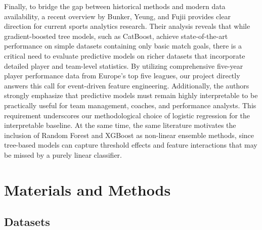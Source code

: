 \documentclass[11pt]{article}
\begin{document}
Finally, to bridge the gap between historical methods and modern data availability, a recent overview by Bunker, Yeung, and Fujii \cite{bunker2024machinelearningsoccermatch} provides clear direction for current sports analytics research. Their analysis reveals that while gradient-boosted tree models, such as CatBoost, achieve state-of-the-art performance on simple datasets containing only basic match goals, there is a critical need to evaluate predictive models on richer datasets that incorporate detailed player and team-level statistics. By utilizing comprehensive five-year player performance data from Europe's top five leagues, our project directly answers this call for event-driven feature engineering. Additionally, the authors strongly emphasize that predictive models must remain highly interpretable to be practically useful for team management, coaches, and performance analysts. This requirement underscores our methodological choice of logistic regression for the interpretable baseline. At the same time, the same literature motivates the inclusion of Random Forest and XGBoost as non-linear ensemble methods, since tree-based models can capture threshold effects and feature interactions that may be missed by a purely linear classifier.

\section{Materials and Methods}

\subsection{Datasets}
\end{document}
